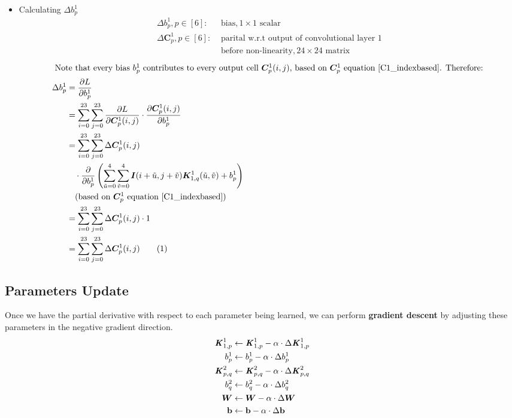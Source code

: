 \documentclass[12pt]{article}
\renewcommand{\vec}[1]{\mathbf{#1}}
\newcommand\numberthis{\stepcounter{equation}\tag{\theequation}}
\begin{document}
\begin{itemize}
\item Calculating $\Delta b^1_p$
\begin{align*}
    \Delta b^1_p, p \in [6]:& \text{ bias}, 1 \times 1 \text{ scalar}\\
    \Delta \bm{C}_{p}^1, p \in [6]:& \text{ parital w.r.t output of convolutional layer 1} \\& \text{ before non-linearity}, 24 \times 24 \text{ matrix}
\end{align*}
\begin{align*}
    \intertext{
    Note that every bias $b^1_p$ contributes to every output cell $\bm{C}_{p}^1(i, j)$, based on $\bm{C}_{p}^1$ equation $\eqref{C1_indexbased}$. Therefore:
    }
    \Delta b^1_p
    &= \frac{\partial L}{\partial b^1_p}
    \\
    &= \sum_{i=0}^{23}\sum_{j=0}^{23}\frac{\partial L}{\partial\bm{C}_{p}^1(i, j)}
    \cdot
    \frac{\partial\bm{C}_{p}^1(i, j)}{\partial b^1_p}
    \\
    &= \sum_{i=0}^{23}\sum_{j=0}^{23}\Delta \bm{C}_{p}^1(i, j)\\
    &\quad\cdot
    \frac{\partial}{\partial b^1_p}
    \left(\sum_{\Tilde{u} = 0}^4\sum_{\Tilde{v} = 0}^4\bm{I}(i + \Tilde{u}, j + \Tilde{v})\bm{K}^1_{1, q}(\Tilde{u}, \Tilde{v}) + b^1_p\right)
    \\
    &\quad (\text{based on $\bm{C}_{p}^1$ equation } \eqref{C1_indexbased})
    \\
    &= \sum_{i=0}^{23}\sum_{j=0}^{23}\Delta \bm{C}_{p}^1(i, j) \cdot 1\\
    &= \sum_{i=0}^{23}\sum_{j=0}^{23}\Delta \bm{C}_{p}^1(i, j)
    \numberthis \label{delta_b1}
\end{align*}

\end{itemize}

\subsection{Parameters Update}
Once we have the partial derivative with respect to each parameter being learned, we can perform \textbf{gradient descent} by adjusting these parameters in the negative gradient direction.
\begin{align*}
    \textbf{\textit{K}}_{1, p}^1 &\leftarrow \textbf{\textit{K}}_{1, p}^1 - \alpha \cdot \Delta \textbf{\textit{K}}_{1, p}^1
    \\
    b^1_p &\leftarrow b^1_p - \alpha \cdot \Delta b^1_p
    \\
    \textbf{\textit{K}}_{p, q}^2 &\leftarrow \textbf{\textit{K}}_{p, q}^2 - \alpha \cdot \Delta \textbf{\textit{K}}_{p, q}^2
    \\
    b^2_q &\leftarrow b^2_q - \alpha \cdot \Delta b^2_q
    \\
    \bm{W} &\leftarrow \bm{W} - \alpha \cdot \Delta \bm{W}
    \\
    \vec{b} &\leftarrow \vec{b} - \alpha \cdot \Delta \vec{b}
\end{align*}
\end{document}

